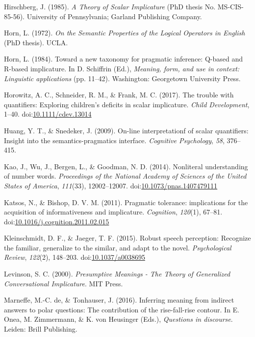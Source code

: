 \documentclass[man]{apa6}
\theoremstyle{definition}
\theoremstyle{definition}
\theoremstyle{definition}
\theoremstyle{remark}
\begin{document}
\hypertarget{ref-Hirschberg1985}{}
Hirschberg, J. (1985). \emph{A Theory of Scalar Implicature} (PhD thesis
No. MS-CIS-85-56). University of Pennsylvania; Garland Publishing
Company.

\hypertarget{ref-Horn1972}{}
Horn, L. (1972). \emph{On the Semantic Properties of the Logical
Operators in English} (PhD thesis). UCLA.

\hypertarget{ref-horn1984}{}
Horn, L. (1984). Toward a new taxonomy for pragmatic inference: Q-based
and R-based implicature. In D. Schiffrin (Ed.), \emph{Meaning, form, and
use in context: Linguistic applications} (pp. 11--42). Washington:
Georgetown University Press.

\hypertarget{ref-Horowitz2017}{}
Horowitz, A. C., Schneider, R. M., \& Frank, M. C. (2017). The trouble
with quantifiers: Exploring children's deficits in scalar implicature.
\emph{Child Development}, 1--40.
doi:\href{https://doi.org/10.1111/cdev.13014}{10.1111/cdev.13014}

\hypertarget{ref-huang2009}{}
Huang, Y. T., \& Snedeker, J. (2009). On-line interpretationf of scalar
quantifiers: Insight into the semantics-pragmatics interface.
\emph{Cognitive Psychology}, \emph{58}, 376--415.

\hypertarget{ref-Kao2014}{}
Kao, J., Wu, J., Bergen, L., \& Goodman, N. D. (2014). Nonliteral
understanding of number words. \emph{Proceedings of the National Academy
of Sciences of the United States of America}, \emph{111}(33),
12002--12007.
doi:\href{https://doi.org/10.1073/pnas.1407479111}{10.1073/pnas.1407479111}

\hypertarget{ref-Katsos2011}{}
Katsos, N., \& Bishop, D. V. M. (2011). Pragmatic tolerance:
implications for the acquisition of informativeness and implicature.
\emph{Cognition}, \emph{120}(1), 67--81.
doi:\href{https://doi.org/10.1016/j.cognition.2011.02.015}{10.1016/j.cognition.2011.02.015}

\hypertarget{ref-Kleinschmidt2015}{}
Kleinschmidt, D. F., \& Jaeger, T. F. (2015). Robust speech perception:
Recognize the familiar, generalize to the similar, and adapt to the
novel. \emph{Psychological Review}, \emph{122}(2), 148--203.
doi:\href{https://doi.org/10.1037/a0038695}{10.1037/a0038695}

\hypertarget{ref-levinson2000}{}
Levinson, S. C. (2000). \emph{Presumptive Meanings - The Theory of
Generalized Conversational Implicature}. MIT Press.

\hypertarget{ref-DeMarneffe2017}{}
Marneffe, M.-C. de, \& Tonhauser, J. (2016). Inferring meaning from
indirect answers to polar questions: The contribution of the
rise-fall-rise contour. In E. Onea, M. Zimmermann, \& K. von Heusinger
(Eds.), \emph{Questions in discourse}. Leiden: Brill Publishing.
\end{document}
